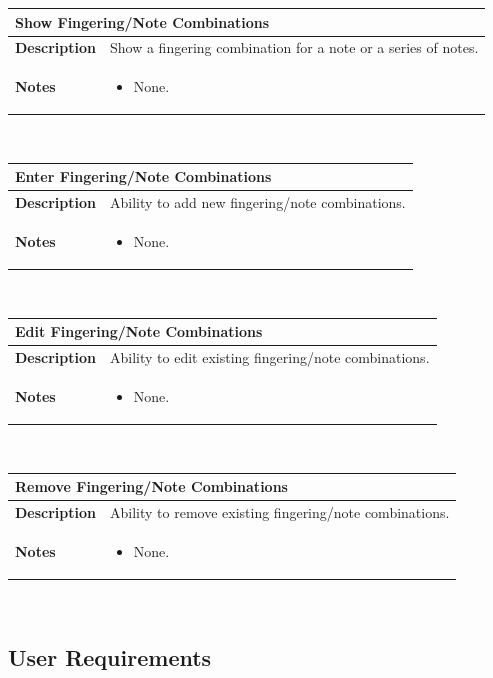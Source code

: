 \documentclass[12pt,english]{article}
\providecommand{\tabularnewline}{\\}
\providecommand{\tabularnewline}{\\}
\begin{document}
\begin{tabular}{|p{3cm}|p{13cm}|}
\hline 
\multicolumn{2}{|l|}{\textbf{Show Fingering/Note Combinations}}\tabularnewline
\hline 
\textbf{Description}  & Show a fingering combination for a note or a series of notes. \tabularnewline
\hline 
\textbf{Notes}  & \begin{itemize}
\item None. \end{itemize}
\tabularnewline
\hline 
\end{tabular}\\[0.5cm] %
\begin{tabular}{|p{3cm}|p{13cm}|}
\hline 
\multicolumn{2}{|l|}{\textbf{Enter Fingering/Note Combinations}}\tabularnewline
\hline 
\textbf{Description}  & Ability to add new fingering/note combinations. \tabularnewline
\hline 
\textbf{Notes}  & \begin{itemize}
\item None. \end{itemize}
\tabularnewline
\hline 
\end{tabular}\\[0.5cm] %
\begin{tabular}{|p{3cm}|p{13cm}|}
\hline 
\multicolumn{2}{|l|}{\textbf{Edit Fingering/Note Combinations}}\tabularnewline
\hline 
\textbf{Description}  & Ability to edit existing fingering/note combinations. \tabularnewline
\hline 
\textbf{Notes}  & \begin{itemize}
\item None. \end{itemize}
\tabularnewline
\hline 
\end{tabular}\\[0.5cm] %
\begin{tabular}{|p{3cm}|p{13cm}|}
\hline 
\multicolumn{2}{|l|}{\textbf{Remove Fingering/Note Combinations}}\tabularnewline
\hline 
\textbf{Description}  & Ability to remove existing fingering/note combinations. \tabularnewline
\hline 
\textbf{Notes}  & \begin{itemize}
\item None. \end{itemize}
\tabularnewline
\hline 
\end{tabular}\\[0.5cm]


\subsection{User Requirements}
\end{document}
